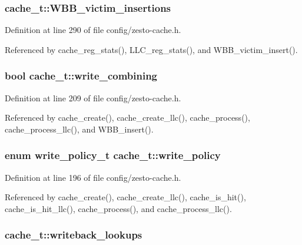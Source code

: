 \subsubsection[{WBB\_\-victim\_\-insertions}]{ {\bf cache\_\-t::WBB\_\-victim\_\-insertions}}\label{structcache__t_df6db938aa2867951815e7af6bf2e335}




Definition at line 290 of file config/zesto-cache.h.

Referenced by cache\_\-reg\_\-stats(), LLC\_\-reg\_\-stats(), and WBB\_\-victim\_\-insert().
\subsubsection[{write\_\-combining}]{\setlength{\rightskip}{0pt plus 5cm}bool {\bf cache\_\-t::write\_\-combining}}\label{structcache__t_1b6ff3b6340f24e9083bbb6fadcae7e3}




Definition at line 209 of file config/zesto-cache.h.

Referenced by cache\_\-create(), cache\_\-create\_\-llc(), cache\_\-process(), cache\_\-process\_\-llc(), and WBB\_\-insert().
\subsubsection[{write\_\-policy}]{\setlength{\rightskip}{0pt plus 5cm}enum {\bf write\_\-policy\_\-t} {\bf cache\_\-t::write\_\-policy}}\label{structcache__t_4d1a99bcbfd631210afe798dff0906e5}




Definition at line 196 of file config/zesto-cache.h.

Referenced by cache\_\-create(), cache\_\-create\_\-llc(), cache\_\-is\_\-hit(), cache\_\-is\_\-hit\_\-llc(), cache\_\-process(), and cache\_\-process\_\-llc().
\subsubsection[{writeback\_\-lookups}]{ {\bf cache\_\-t::writeback\_\-lookups}}\label{structcache__t_9e84cff1fccc19c9969530312417d21e}




